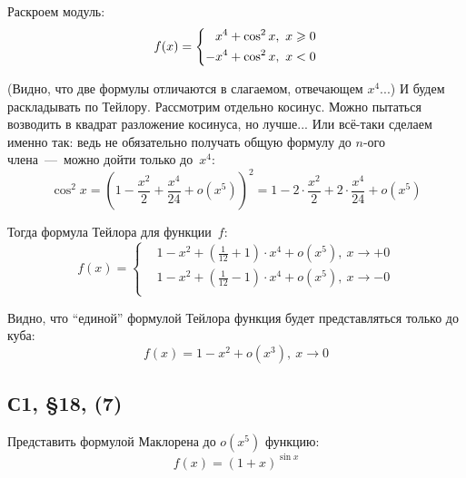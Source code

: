 \documentclass[a4paper,12pt]{article}
\begin{document}
  \begin{solution}
    Раскроем модуль:
    \[
      f(x) = \left\{
        \begin{aligned}
          &\hphantom{+}x^4 + \cos^2 x,\ x \geq 0\\
          &{-}x^4 + \cos^2 x,\ x < 0
        \end{aligned}
      \right.
    \]
    
    (Видно, что две формулы отличаются в слагаемом, отвечающем $x^4$...)
    И будем раскладывать по Тейлору.
    Рассмотрим отдельно косинус.
    Можно пытаться возводить в квадрат разложение косинуса, но лучше...
    Или всё-таки сделаем именно так: ведь не обязательно получать общую формулу до $n$-ого члена~---~можно дойти только до~$x^4$:
    \[
      \cos^2 x = \left(1 - \frac{x^2}{2} + \frac{x^4}{24} + o(x^5)\right)^2
        = 1 - 2 \cdot \frac{x^2}{2} + 2 \cdot \frac{x^4}{24} + o(x^5)
    \]
    
    Тогда формула Тейлора для функции~$f$:
    \[
      f(x) = \left\{
        \begin{aligned}
          &1 - x^2 + \left(\frac{1}{12} + 1\right) \cdot x^4 + o(x^5),\ x \to +0\\
          &1 - x^2 + \left(\frac{1}{12} - 1\right) \cdot x^4 + o(x^5),\ x \to -0\\
        \end{aligned}
      \right.
    \]
    
    Видно, что ``единой'' формулой Тейлора функция будет представляться только до куба:
    \[
      f(x) = 1 - x^2 + o(x^3),\ x \to 0
    \]
  \end{solution}
  
  
  
  
  
  \subsection{С1, \S 18, (7)}
  
  Представить формулой Маклорена до $o(x^5)$ функцию:
  \[
    f(x) = (1 + x)^{\sin x}
  \]
  
\end{document}
